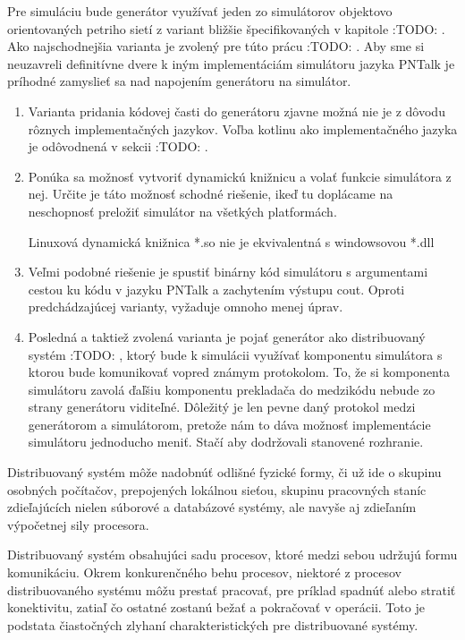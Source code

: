 Pre simuláciu bude generátor využívať jeden zo simulátorov objektovo orientovaných petriho sietí z variant bližšie špecifikovaných v kapitole :TODO: . Ako najschodnejšia varianta je zvolený pre túto prácu :TODO: . Aby sme si neuzavreli definitívne dvere k iným implementáciám simulátoru jazyka PNTalk je príhodné zamyslieť sa nad napojením generátoru na simulátor. 

\begin{enumerate}
	\item Varianta pridania kódovej časti do generátoru zjavne možná nie je z dôvodu rôznych implementačných jazykov. Voľba kotlinu ako implementačného jazyka je odôvodnená v sekcii :TODO: .
	
	\item Ponúka sa možnosť vytvoriť dynamickú knižnicu a volať funkcie simulátora z nej. Určite je táto možnosť schodné riešenie, ikeď tu doplácame na neschopnosť preložiť simulátor na všetkých platformách.
	
	\begin{note}
		Linuxová dynamická knižnica *.so nie je ekvivalentná s windowsovou *.dll
	\end{note}
	
	\item Veľmi podobné riešenie je spustiť binárny kód simulátoru s argumentami cestou ku kódu v jazyku PNTalk a zachytením výstupu cout. Oproti predchádzajúcej varianty, vyžaduje omnoho menej úprav.
	
	\item Posledná a taktiež zvolená varianta je pojať generátor ako distribuovaný systém :TODO: , ktorý bude k simulácii využívať komponentu simulátora s ktorou bude komunikovať vopred známym protokolom. To, že si komponenta simulátoru zavolá ďaľšiu komponentu prekladača do medzikódu nebude zo strany generátoru viditeľné. Dôležitý je len pevne daný protokol medzi generátorom a simulátorom, pretože nám to dáva možnosť implementácie simulátoru jednoducho meniť. Stačí aby dodržovali stanovené rozhranie.
	
\end{enumerate}

Distribuovaný systém môže nadobnúť odlišné fyzické formy, či už ide o skupinu osobných počítačov, prepojených lokálnou sieťou, skupinu pracovných staníc zdieľajúcích nielen súborové a databázové systémy, ale navyše aj zdieľaním výpočetnej sily procesora.\cite{}

Distribuovaný systém obsahujúci sadu procesov, ktoré medzi sebou udržujú formu komunikáciu. Okrem konkurenčného behu procesov, niektoré z procesov distribuovaného systému môžu prestať pracovať, pre príklad spadnúť alebo stratiť konektivitu, zatiaľ čo ostatné zostanú bežať a pokračovať v operácii. Toto je podstata čiastočných zlyhaní charakteristických pre distribuované systémy.

